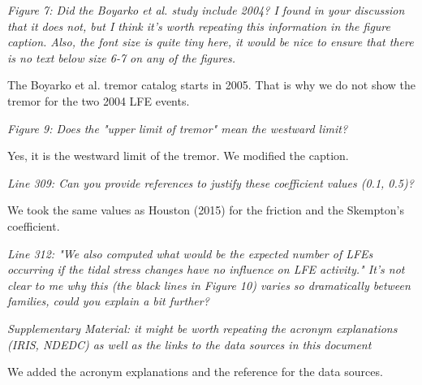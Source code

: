 \documentclass[letterpaper, 12pt]{article}
\begin{document}
\bigskip

\textit{Figure 7: Did the Boyarko et al. study include 2004? I found in your discussion that it does not, but I think it's worth repeating this information in the figure caption. Also, the font size is quite tiny here, it would be nice to ensure that there is no text below size 6-7 on any of the figures.}

\bigskip

The Boyarko et al. tremor catalog starts in 2005. That is why we do not show the tremor for the two 2004 LFE events.

\bigskip

\textit{Figure 9: Does the "upper limit of tremor" mean the westward limit?}

\bigskip

Yes, it is the westward limit of the tremor. We modified the caption.

\bigskip

\textit{Line 309: Can you provide references to justify these coefficient values (0.1, 0.5)?}

\bigskip

We took the same values as Houston (2015) for the friction and the Skempton's coefficient.

\bigskip

\textit{Line 312: "We also computed what would be the expected number of LFEs occurring if the tidal stress changes have no influence on LFE activity." It's not clear to me why this (the black lines in Figure 10) varies so dramatically between families, could you explain a bit further?}

\bigskip

\textit{Supplementary Material: it might be worth repeating the acronym explanations (IRIS, NDEDC) as well as the links to the data sources in this document}

\bigskip

We added the acronym explanations and the reference for the data sources.
\end{document}
